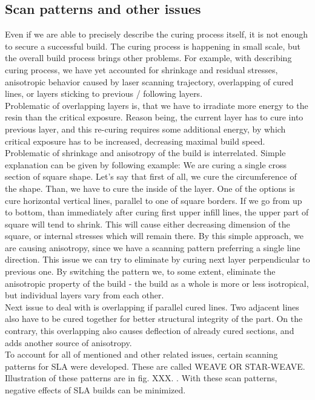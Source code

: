 \documentclass[a4paper, twoside, 11pt]{report}
\begin{document}
\subsection{Scan patterns and other issues}
Even if we are able to precisely describe the curing process itself, it is not enough to secure a successful build. The curing process is happening in small scale, but the overall build process brings other problems. For example, with describing curing process, we have yet accounted for shrinkage and residual stresses, anisotropic behavior caused by laser scanning trajectory, overlapping of cured lines, or layers sticking to previous / following layers.\\
Problematic of overlapping layers is, that we have to irradiate more energy to the resin than the critical exposure. Reason being, the current layer has to cure into previous layer, and this re-curing requires some additional energy, by which critical exposure has to be increased, decreasing maximal build speed.\\
Problematic of shrinkage and anisotropy of the build is interrelated. Simple explanation can be given by following example: We are curing a single cross section of square shape. Let's say that first of all, we cure the circumference of the shape. Than, we have to cure the inside of the layer. One of the options is cure horizontal vertical lines, parallel to one of square borders. If we go from up to bottom, than immediately after curing first upper infill lines, the upper part of square will tend to shrink. This will cause either decreasing dimension of the square, or internal stresses which will remain there.  By this simple approach, we are causing anisotropy, since we have a scanning pattern preferring a single line direction. This issue we can try to eliminate by curing next layer perpendicular to previous one. By switching the pattern we, to some extent, eliminate the anisotropic property of the build - the build as a whole is more or less isotropical, but individual layers vary from each other.\\
Next issue to deal with is overlapping if parallel cured lines. Two adjacent lines also have to be cured together for better structural integrity of the part. On the contrary, this overlapping also causes deflection of already cured sections, and adds another source of anisotropy.\\
To account for all of mentioned and other related issues, certain scanning patterns for SLA were developed. These are called WEAVE OR STAR-WEAVE. Illustration of these patterns are in fig. XXX. . With these scan patterns, negative effects of SLA builds can be minimized.
\end{document}

